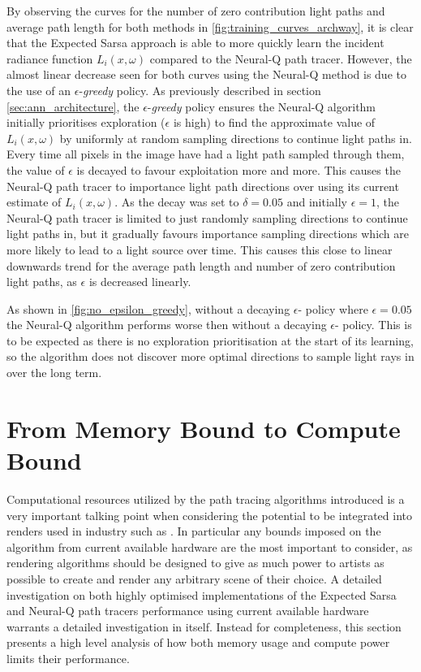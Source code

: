 \documentclass[../dissertation.tex]{subfiles}
\begin{document}
By observing the curves for the number of zero contribution light paths and average path length for both methods in \ref{fig:training_curves_archway}, it is clear that the Expected Sarsa approach is able to more quickly learn the incident radiance function $L_i(x, \omega)$ compared to the Neural-Q path tracer. However, the almost linear decrease seen for both curves using the Neural-Q method is due to the use of an $\epsilon$-\textit{greedy} policy. As previously described in section \ref{sec:ann_architecture}, the $\epsilon$-\textit{greedy} policy ensures the Neural-Q algorithm initially prioritises exploration ($\epsilon$ is high) to find the approximate value of $L_i(x,\omega)$ by uniformly at random sampling directions to continue light paths in. Every time all pixels in the image have had a light path sampled through them, the value of $\epsilon$ is decayed to favour exploitation more and more. This causes the Neural-Q path tracer to importance light path directions over using its current estimate of $L_i(x, \omega)$. As the decay was set to $\delta = 0.05$ and initially $\epsilon = 1$, the Neural-Q path tracer is limited to just randomly sampling directions to continue light paths in, but it gradually favours importance sampling directions which are more likely to lead to a light source over time. This causes this close to linear downwards trend for the average path length and number of zero contribution light paths, as $\epsilon$ is decreased linearly. 



As shown in \ref{fig:no_epsilon_greedy}, without a decaying $\epsilon$- policy where $\epsilon = 0.05$ the Neural-Q algorithm performs worse then without a decaying $\epsilon$- policy. This is to be expected as there is no exploration prioritisation at the start of its learning, so the algorithm does not discover more optimal directions to sample light rays in over the long term.

\section{From Memory Bound to Compute Bound}
\label{sec:mem_to_comp}

Computational resources utilized by the path tracing algorithms introduced is a very important talking point when considering the potential to be integrated into renders used in industry such as \cite{georgiev2018arnold, christensen2018renderman, hyperion}. In particular any bounds imposed on the algorithm from current available hardware are the most important to consider, as rendering algorithms should be designed to give as much power to artists as possible to create and render any arbitrary scene of their choice. A detailed investigation on both highly optimised implementations of the Expected Sarsa and Neural-Q path tracers performance using current available hardware warrants a detailed investigation in itself. Instead for completeness, this section presents a high level analysis of how both memory usage and compute power limits their performance.
\end{document}
